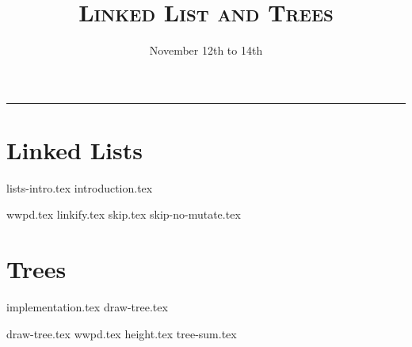 \documentclass{exam}
\title{\textsc{Linked List and Trees}}
\date{November 12th to 14th}
\begin{document}
\maketitle
\rule{\textwidth}{0.15em}
\fontsize{12}{15}\selectfont


\section{Linked Lists}
{lists-intro.tex}
{introduction.tex}
\begin{questions}
{wwpd.tex}
\newpage
{linkify.tex}
{skip.tex}
{skip-no-mutate.tex}
\end{questions}
\newpage
\section{Trees}
{implementation.tex}
{draw-tree.tex}
\newpage
\begin{questions}
{draw-tree.tex}
{wwpd.tex}
{height.tex}
{tree-sum.tex}


\end{questions}
\end{document}
